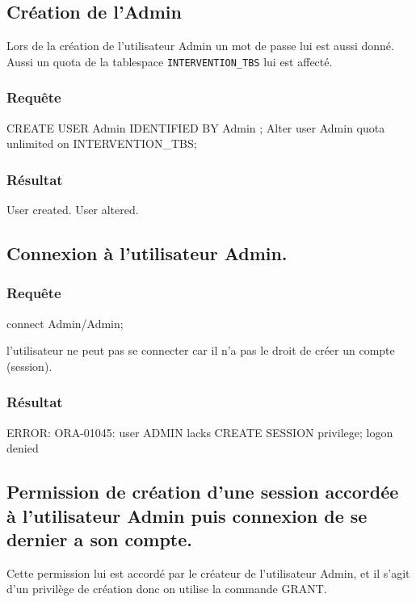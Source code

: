 \documentclass[•]{article}
\begin{document}
\def\reportnumber{2}
\def\reporttitle{Gestion des droits}


\subsection{Création de l'Admin}
\textrm{Lors de la création de l'utilisateur Admin un mot de passe lui est aussi donné.}
\textrm{Aussi un quota de la tablespace \texttt{INTERVENTION\_TBS} lui est affecté. }

\subsubsection{Requête}
\begin{sql}
CREATE USER Admin IDENTIFIED BY Admin ;
Alter user Admin quota unlimited on INTERVENTION_TBS;
\end{sql}
\subsubsection{Résultat}
\begin{sql}
User created.
User altered.
\end{sql}


\subsection{Connexion à l'utilisateur Admin.}
\subsubsection{Requête}
\begin{sql}
connect Admin/Admin;
\end{sql}
\textrm{l'utilisateur ne peut pas se connecter car il n'a pas le droit de créer un compte (session).}
\subsubsection{Résultat}
\begin{sql}
ERROR:
ORA-01045: user ADMIN lacks CREATE SESSION privilege; logon denied
\end{sql}
\subsection{Permission de création d’une session accordée à l'utilisateur Admin puis connexion de se dernier a son compte.}

\textrm{Cette permission lui est accordé par le créateur de l'utilisateur Admin, et il s'agit d'un privilège de création donc on utilise la commande GRANT. }
\end{document}
